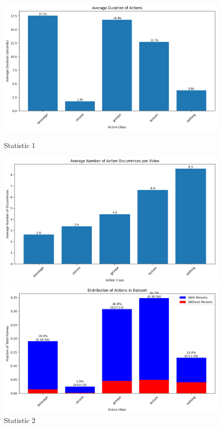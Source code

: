 \begin{figure}[H]
    \centering
    \begin{minipage}{0.245\textwidth}
        \centering
        \includegraphics[width=\textwidth]{assets/figures/average-duration-of-actions.png}
        \caption{Statistic 1}
        \label{fig:example1}
    \end{minipage}%
    \hspace{0.02\textwidth} %
    \begin{minipage}{0.245\textwidth}
        \centering
        \includegraphics[width=\textwidth]{assets/figures/average-number-of-action-occurences-per-video.png}
        \caption{Statistic 2}
        \label{fig:example2}
    \end{minipage}%
    \hspace{0.02\textwidth} %
    \begin{minipage}{0.245\textwidth}
        \centering
        \includegraphics[width=\textwidth]{assets/figures/distribution-of-actions-in-dataset.png}

\end{minipage}
\end{figure}
